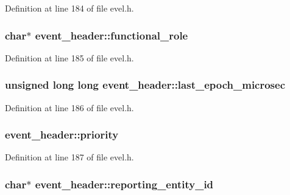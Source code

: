 Definition at line 184 of file evel.\+h.

\hypertarget{structevent__header_a12896af9697cc5e5b678123a381c5086}{}
\subsubsection[{functional\+\_\+role}]{\setlength{\rightskip}{0pt plus 5cm}char$\ast$ event\+\_\+header\+::functional\+\_\+role}\label{structevent__header_a12896af9697cc5e5b678123a381c5086}


Definition at line 185 of file evel.\+h.

\hypertarget{structevent__header_a5b7f178cb9755cc1f2b635e6c615133c}{}
\subsubsection[{last\+\_\+epoch\+\_\+microsec}]{\setlength{\rightskip}{0pt plus 5cm}unsigned long long event\+\_\+header\+::last\+\_\+epoch\+\_\+microsec}\label{structevent__header_a5b7f178cb9755cc1f2b635e6c615133c}


Definition at line 186 of file evel.\+h.

\hypertarget{structevent__header_a864abe4580ddd9c0b86a2df7fa19fbbe}{}
\subsubsection[{priority}]{ event\+\_\+header\+::priority}\label{structevent__header_a864abe4580ddd9c0b86a2df7fa19fbbe}


Definition at line 187 of file evel.\+h.

\hypertarget{structevent__header_a43987af0098095813752ad1ca6d295d6}{}
\subsubsection[{reporting\+\_\+entity\+\_\+id}]{\setlength{\rightskip}{0pt plus 5cm}char$\ast$ event\+\_\+header\+::reporting\+\_\+entity\+\_\+id}\label{structevent__header_a43987af0098095813752ad1ca6d295d6}


